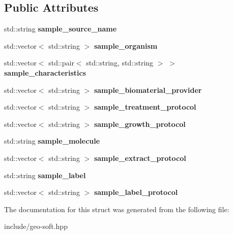 \subsection*{Public Attributes}
\begin{DoxyCompactItemize}
\item 
\mbox{\label{structGeoSoftChannel_afa7a7d494b8cae2bc86147747c8756ea}} 
std\+::string {\bfseries sample\+\_\+source\+\_\+name}
\item 
\mbox{\label{structGeoSoftChannel_a560b9467c399e867aca56e3c700c2c4d}} 
std\+::vector$<$ std\+::string $>$ {\bfseries sample\+\_\+organism}
\item 
\mbox{\label{structGeoSoftChannel_af5daae70957d7d630af42615ec8e591a}} 
std\+::vector$<$ std\+::pair$<$ std\+::string, std\+::string $>$ $>$ {\bfseries sample\+\_\+characteristics}
\item 
\mbox{\label{structGeoSoftChannel_abb3ff023351fdc307abeee1e67a48c00}} 
std\+::vector$<$ std\+::string $>$ {\bfseries sample\+\_\+biomaterial\+\_\+provider}
\item 
\mbox{\label{structGeoSoftChannel_a04faf91b919c3b505dda80ed18fb0888}} 
std\+::vector$<$ std\+::string $>$ {\bfseries sample\+\_\+treatment\+\_\+protocol}
\item 
\mbox{\label{structGeoSoftChannel_a85ff54508cabdf6461a6d9cf0087072a}} 
std\+::vector$<$ std\+::string $>$ {\bfseries sample\+\_\+growth\+\_\+protocol}
\item 
\mbox{\label{structGeoSoftChannel_ae33a3ee6e786ccda260dbbb74e4930ef}} 
std\+::string {\bfseries sample\+\_\+molecule}
\item 
\mbox{\label{structGeoSoftChannel_ae8eddd58a62be7cf23d8e3c218706a00}} 
std\+::vector$<$ std\+::string $>$ {\bfseries sample\+\_\+extract\+\_\+protocol}
\item 
\mbox{\label{structGeoSoftChannel_a9380bc8aa2ad9a93901273e8d284ce66}} 
std\+::string {\bfseries sample\+\_\+label}
\item 
\mbox{\label{structGeoSoftChannel_ace3d3dba88974a1f64a0da8a98a81a80}} 
std\+::vector$<$ std\+::string $>$ {\bfseries sample\+\_\+label\+\_\+protocol}
\end{DoxyCompactItemize}


The documentation for this struct was generated from the following file\+:\begin{DoxyCompactItemize}
\item 
include/geo-\/soft.\+hpp\end{DoxyCompactItemize}
